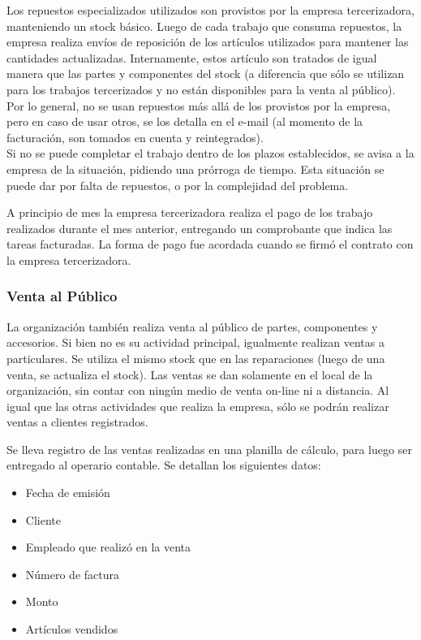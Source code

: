 \documentclass[12pt]{extarticle}
\begin{document}
\begin{spacing}{1.2}
    Los repuestos especializados utilizados son provistos por la empresa tercerizadora, manteniendo un stock básico. Luego de cada trabajo que consuma repuestos, la empresa realiza envíos de reposición de los artículos utilizados para mantener las cantidades actualizadas. 
    Internamente, estos artículo son tratados de igual manera que las partes y componentes del stock (a diferencia que sólo se utilizan para los trabajos tercerizados y no están disponibles para la venta al público).
    Por lo general, no se usan repuestos más allá de los provistos por la empresa, pero en caso de usar otros, se los detalla en el e-mail (al momento de la facturación, son tomados en cuenta y reintegrados).\\

    Si no se puede completar el trabajo dentro de los plazos establecidos, se avisa a la empresa de la situación, pidiendo una prórroga de tiempo. Esta situación se puede dar por falta de repuestos, o por la complejidad del problema.

    A principio de mes la empresa tercerizadora realiza el pago de los trabajo realizados durante el mes anterior, entregando un comprobante que indica las tareas facturadas. La forma de pago fue acordada cuando se firmó el contrato con la empresa tercerizadora.


    \subsubsection{Venta al Público}
    La organización también realiza venta al público de partes, componentes y accesorios. Si bien no es su actividad principal, igualmente realizan ventas a particulares. Se utiliza el mismo stock que en las reparaciones (luego de una venta, se actualiza el stock). 
    Las ventas se dan solamente en el local de la organización, sin contar con ningún medio de venta on-line ni a distancia. Al igual que las otras actividades que realiza la empresa, sólo se podrán realizar ventas a clientes registrados.

    Se lleva registro de las ventas realizadas en una planilla de cálculo, para luego ser entregado al operario contable. Se detallan los siguientes datos:
    \begin{itemize}
        \item Fecha de emisión
        \item Cliente
        \item Empleado que realizó en la venta
        \item Número de factura
        \item Monto
        \item Artículos vendidos
    \end{itemize}


\end{spacing}
\end{document}
